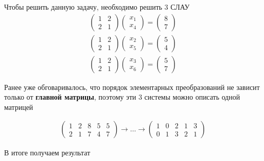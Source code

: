 \documentclass[]{article}
\begin{document}
Чтобы решить данную задачу, необходимо решить 3 СЛАУ
\begin{gather*}
\begin{pmatrix}
	1 & 2 
	\\
	2 & 1
\end{pmatrix}
\begin{pmatrix}
	x_1
	\\
	x_4
\end{pmatrix}
=
\begin{pmatrix}
	8
	\\
	7
\end{pmatrix}
\\
\begin{pmatrix}
	1 & 2 
	\\
	2 & 1
\end{pmatrix}
\begin{pmatrix}
	x_2
	\\
	x_5
\end{pmatrix}
=
\begin{pmatrix}
	5
	\\
	4
\end{pmatrix}
\\
\begin{pmatrix}
	1 & 2 
	\\
	2 & 1
\end{pmatrix}
\begin{pmatrix}
	x_3
	\\
	x_6
\end{pmatrix}
=
\begin{pmatrix}
	5
	\\
	7
\end{pmatrix}
\end{gather*}

Ранее уже обговаривалось, что порядок элементарных преобразований не зависит только от \textbf{главной матрицы}, поэтому эти 3 системы можно описать одной матрицей

\begin{gather*}
\left(
\begin{array}{ll|lll}
	1 & 2 & 8 & 5 & 5
	\\
	2 & 1 & 7 & 4 & 7
\end{array}
\right)\rightarrow
\ldots
\rightarrow
\left(
\begin{array}{ll|lll}
	1 & 0 & 2 & 1 & 3
	\\
	0 & 1 & 3 & 2 & 1
\end{array}
\right)
\end{gather*}

В итоге получаем результат
\end{document}
